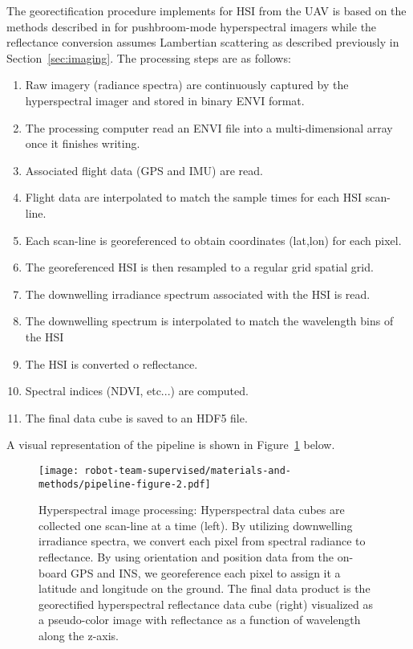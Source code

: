 The georectification procedure implements for HSI from the UAV is based on the
methods described in \cite{muller2002program, baumker2001new, mostafa2000multi}
for pushbroom-mode hyperspectral imagers while the reflectance conversion
assumes Lambertian scattering as described previously in Section~\ref{sec:imaging}.
The processing steps are as follows:

\begin{enumerate}
\item Raw imagery (radiance spectra) are continuously captured by the hyperspectral imager and stored in binary ENVI format.
\item The processing computer read an ENVI file into a multi-dimensional array
  once it finishes writing.
\item Associated flight data (GPS and IMU) are read.
\item Flight data are interpolated to match the sample times for each HSI scan-line.
\item Each scan-line is georeferenced to obtain coordinates (lat,lon) for each pixel.
\item The georeferenced HSI is then resampled to a regular grid spatial grid.
\item The downwelling irradiance spectrum associated with the HSI is read.
\item The downwelling spectrum is interpolated to match the wavelength bins of the HSI
\item The HSI is converted o reflectance.
\item Spectral indices (NDVI, etc...) are computed.
\item The final data cube is saved to an HDF5 file.
\end{enumerate}
A visual representation of the pipeline is shown in
Figure~\ref{fig:hsi-pipeline} below.
\begin{figure}[H]
  \centering
  \texttt{[image: robot-team-supervised/materials-and-methods/pipeline-figure-2.pdf]}
  \caption{Hyperspectral image processing: Hyperspectral data cubes are
    collected one scan-line at a time (left). By utilizing downwelling
    irradiance spectra, we convert each pixel from spectral radiance to
    reflectance. By using orientation and position data from the on-board GPS
    and INS, we georeference each pixel to assign it a latitude and longitude on
    the ground. The final data product is the georectified hyperspectral
    reflectance data cube (right) visualized as a pseudo-color image with
    reflectance  as a function of wavelength along the
    z-axis.\label{fig:hsi-pipeline}}
\end{figure}


